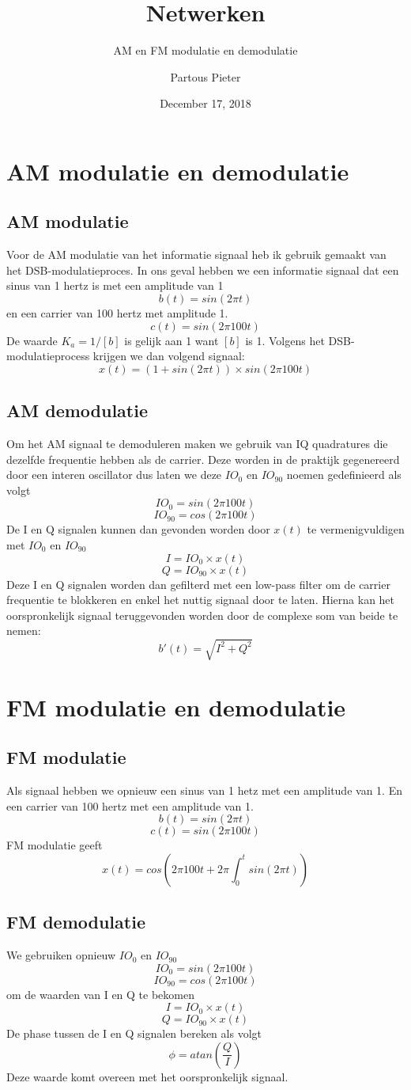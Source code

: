 \documentclass[12px]{article}
\title{Netwerken}
\subtitle{AM en FM modulatie en demodulatie}
\author{Partous Pieter}
\date{December 17, 2018}
\begin{document}
\maketitle
\section{AM modulatie en demodulatie}
\subsection{AM modulatie}
Voor de AM modulatie van het informatie signaal heb ik gebruik gemaakt van het DSB-modulatieproces. In ons geval hebben we een informatie signaal dat een sinus van 1 hertz is met een amplitude van 1
\[b(t)=sin(2 \pi t)\]
en een carrier van 100 hertz met amplitude 1.
\[c(t)=sin(2 \pi 100 t)\]
De waarde $K_a=1/[b]$ is gelijk aan 1 want $[b]$ is 1. Volgens het DSB-modulatieprocess krijgen we dan volgend signaal:
\[x(t)=(1+sin(2 \pi t)) \times sin(2 \pi 100 t)\]

\subsection{AM demodulatie}
Om het AM signaal te demoduleren maken we gebruik van IQ quadratures die dezelfde frequentie hebben als de carrier. Deze worden in de praktijk gegenereerd door een interen oscillator dus laten we deze $IO_0$ en $IO_{90}$ noemen gedefinieerd als volgt
\[IO_0=sin(2 \pi 100 t)\]
\[IO_{90}=cos(2 \pi 100 t)\]
De I en Q signalen kunnen dan gevonden worden door $x(t)$ te vermenigvuldigen met $IO_0$ en $IO_{90}$
\[I=IO_0 \times x(t)\]
\[Q=IO_{90} \times x(t)\]
Deze I en Q signalen worden dan gefilterd met een low-pass filter om de carrier frequentie te blokkeren en enkel het nuttig signaal door te laten. Hierna kan het oorspronkelijk signaal teruggevonden worden door de complexe som van beide te nemen:
\[b'(t)=\sqrt{I^2 + Q^2}\]


\section{FM modulatie en demodulatie}
\subsection{FM modulatie}
Als signaal hebben we opnieuw een sinus van 1 hetz met een amplitude van 1. En een carrier van 100 hertz met een amplitude van 1.
\[b(t)=sin(2 \pi t)\]
\[c(t)=sin(2 \pi 100 t)\]
FM modulatie geeft
\[x(t)=cos\left(2 \pi 100 t + 2 \pi \int_0^t{sin(2 \pi t)}\right)\]

\subsection{FM demodulatie}
We gebruiken opnieuw $IO_0$ en $IO_{90}$
\[IO_0=sin(2 \pi 100 t)\]
\[IO_{90}=cos(2 \pi 100 t)\]
om de waarden van I en Q te bekomen
\[I=IO_0 \times x(t)\]
\[Q=IO_{90} \times x(t)\]
De phase tussen de I en Q signalen bereken als volgt
\[\phi=atan\left(\frac{Q}{I}\right)\]
Deze waarde komt overeen met het oorspronkelijk signaal.
\end{document}

